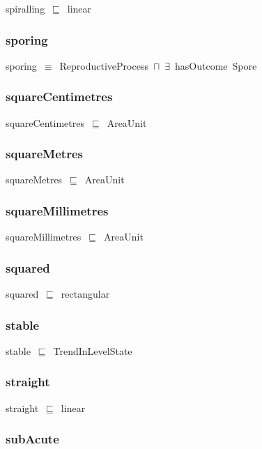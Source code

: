 \documentclass{article}
\begin{document}
spiralling~\ensuremath{\sqsubseteq}~linear~

\subsubsection*{sporing}

sporing~\ensuremath{\equiv}~ReproductiveProcess~\ensuremath{\sqcap}~\ensuremath{\exists}~hasOutcome~Spore

\subsubsection*{squareCentimetres}

squareCentimetres~\ensuremath{\sqsubseteq}~AreaUnit~

\subsubsection*{squareMetres}

squareMetres~\ensuremath{\sqsubseteq}~AreaUnit~

\subsubsection*{squareMillimetres}

squareMillimetres~\ensuremath{\sqsubseteq}~AreaUnit~

\subsubsection*{squared}

squared~\ensuremath{\sqsubseteq}~rectangular~

\subsubsection*{stable}

stable~\ensuremath{\sqsubseteq}~TrendInLevelState~

\subsubsection*{straight}

straight~\ensuremath{\sqsubseteq}~linear~

\subsubsection*{subAcute}
\end{document}
